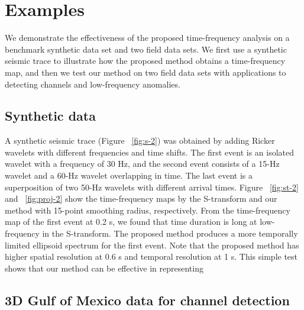 \section{Examples}

We demonstrate the effectiveness of the proposed time-frequency
analysis on a benchmark synthetic data set and two field data sets.
We first use a synthetic seismic trace to illustrate how the proposed
method obtains a time-frequency map, and then we test our method
on two field data sets with applications to detecting channels and
low-frequency anomalies.

 \subsection{Synthetic data}
 

A synthetic seismic trace (Figure ~\ref{fig:s-2}) was obtained by adding
Ricker wavelets with different frequencies and time shifts. The first
event is an isolated wavelet with a frequency of 30 Hz, and the
second event consists of a 15-Hz wavelet and a 60-Hz wavelet
overlapping in time. The last event is a superposition of two 50-Hz
wavelets with different arrival times. Figure ~\ref{fig:st-2} and ~\ref{fig:proj-2} show the
time-frequency maps by the S-transform and our method with
15-point smoothing radius, respectively. From the time-frequency
map of the first event at 0.2 s, we found that time duration is long
at low-frequency in the S-transform. The proposed method produces
a more temporally limited ellipsoid spectrum for the first
event. Note that the proposed method has higher spatial resolution
at 0.6 s and temporal resolution at 1 s. This simple test shows that
our method can be effective in representing

\subsection{3D Gulf of Mexico data for channel detection}


